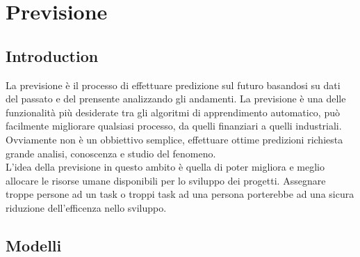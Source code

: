 \documentclass[%
    corpo=12pt,
    twoside,
    oldstyle,
    autoretitolo,
    greek,
    evenboxes,
]{toptesi}
\begin{document}

\chapter{Previsione}
\label{chap:forecasting}
\section{Introduction}
La previsione è il processo di effettuare predizione sul futuro basandosi su dati del passato e del prensente analizzando gli andamenti. La previsione è una delle funzionalità più desiderate tra gli algoritmi di apprendimento automatico, può facilmente migliorare qualsiasi processo, da quelli finanziari a quelli industriali. Ovviamente non è un obbiettivo semplice, effettuare ottime predizioni richiesta grande analisi, conoscenza e studio del fenomeno.\\
L'idea della previsione in questo ambito è quella di poter migliora e meglio allocare le risorse umane disponibili per lo sviluppo dei progetti. Assegnare troppe persone ad un task o troppi task ad una persona porterebbe ad una sicura riduzione dell'efficenza nello sviluppo.

\section{Modelli}


















\end{document}
